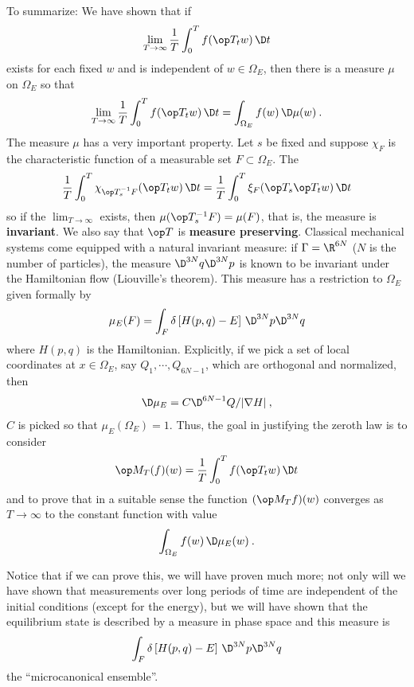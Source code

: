 To summarize: We have shown that if
\begin{align}
    \lim_{T \rightarrow \infty} \frac{1}{T} \int_0^T f(\op T_t w) \, \D t
\end{align}
exists for each fixed $w$ and is independent of $w \in \Omega_E$, then there is a measure $\mu$ on $\Omega_E$ so that
\begin{align}
    \lim_{T \rightarrow \infty} \frac{1}{T} \int_0^T f(\op T_t w) \, \D t = \int_{\Omega_E} f(w) \, \D \mu(w) \:.
\end{align}
The measure $\mu$ has a very important property. Let $s$ be fixed and suppose $\chi_F$ is the characteristic function of a measurable set $F \subset \Omega_E$. The \begin{align}
    \frac{1}{T} \int_0^T \chi_{\op T_s^{-1} F} (\op T_t w) \, \D t = \frac{1}{T} \int_0^T \xi_F (\op T_s \op T_t w) \, \D t
\end{align}
so if the $\lim_{T \rightarrow \infty}$ exists, then $\mu(\op T_s^{-1}F) = \mu(F)$, that is, the measure is \textbf{invariant}. We also say that $\op T$ is \textbf{measure preserving}. Classical mechanical systems come equipped with a natural invariant measure: if $\Gamma = \R^{6N}$ ($N$ is the number of particles), the measure $\D^{3N} q \D^{3N} p$ is known to be invariant under the Hamiltonian flow (Liouville’s theorem). This measure has a restriction to $\Omega_E$ given formally by
\begin{align}
    \mu_E(F) = \int_F \delta \left[ H(p,q) - E \right] \, \D^{3N} p \D^{3N} q
\end{align}
where $H(p,q)$ is the Hamiltonian.
Explicitly, if we pick a set of local coordinates at $x \in \Omega_E$, say $Q_1, \cdots, Q_{6N-1}$, which are orthogonal and normalized, then
\begin{align}
    \D \mu_E = C \D^{6N-1} Q/ |\nabla H| \:,
\end{align}
$C$ is picked so that $\mu_E(\Omega_E) = 1$. Thus, the goal in justifying the zeroth law is to consider \begin{align}
    \op M_T(f)(w) = \frac{1}{T} \int_0^T f(\op T_t w) \, \D t
\end{align}
and to prove that in a suitable sense the function $(\op M_T f)(w)$ converges as $T \rightarrow \infty$ to the constant function with value
\begin{align}
    \int_{\Omega_E} f(w) \, \D \mu_E(w) \:.
\end{align}

Notice that if we can prove this, we will have proven much more; not only will we have shown that measurements over long periods of time are independent of the initial conditions (except for the energy), but we will have shown that the equilibrium state is described by a measure in phase space and this measure is
\begin{align}
    \int_F \delta \left[ H(p,q) - E \right] \, \D^{3N} p \D^{3N} q
\end{align}
the \enquote{microcanonical ensemble}.